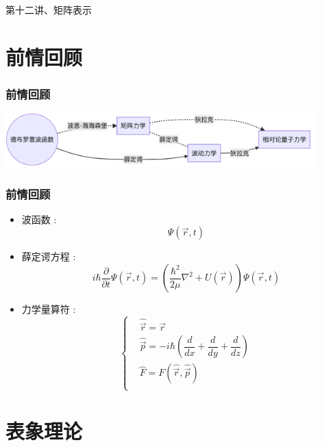 \begin{frame}
    \frametitle{}
    \begin{center}
    { {\huge 第十二讲、矩阵表示}}
    \end{center}    
\end{frame}

\section{前情回顾}

\begin{frame}
    \frametitle{前情回顾}
    \begin{center}
        \includegraphics[width=0.9\textwidth]{figs/2021-12-06-16-22-39.png}\\   
    \end{center}
\end{frame}



\begin{frame}
    \frametitle{前情回顾}
    \begin{itemize}
        \item 波函数 : $$ \Psi(\vec{r},t)$$
        \item 薛定谔方程 :     
        \begin{equation*}
            i\hbar \frac{\partial }{\partial t} \Psi(\vec{r},t) = (\frac{\hbar^2}{2\mu} \nabla^2 +U(\vec{r})) \Psi(\vec{r},t)
        \end{equation*}
        \item 力学量算符 :
        $$\left\{ \begin{aligned}
            &\hat{\vec{r}} =\vec{r}  \\
            &\hat{\vec{p}} =-i\hbar(\dfrac{d}{d x}+ \dfrac{d}{d y} + \dfrac{d}{d z}) \\
            &\hat{F}=F(\hat{\vec{r}},\hat{\vec{p}}) \\
        \end{aligned} \right.$$
    \end{itemize}   
\end{frame} 

\section{表象理论}


